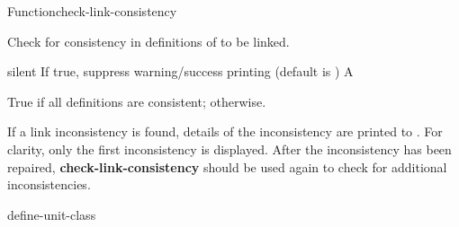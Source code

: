 \documentclass[10pt,twoside,english,pdftex]{article}
\begin{document}
\begin{functiondoc}{Function}{check-link-consistency}{
    \returns{} }
%

\fnsyntax

\fnpurpose Check for consistency in  definitions of
 to be linked.

\fnpackage {}

\fnmodule {}

\fnargs
\begin{args}{silent}
\arg[silent] If true, suppress warning/success printing (default is \nil) 
\arg[boolean] A 
\end{args}

\fnreturns True if all  definitions are consistent; \nil{}
otherwise. 

\fndescription If a link inconsistency is found, details of the
inconsistency are printed to .  For clarity,
only the first inconsistency is displayed.  After the inconsistency
has been repaired, \textbf{check-link-consistency} should be used
again to check for additional inconsistencies.

\begin{alsos}{define-unit-class}
\end{alsos}


\end{functiondoc}
\end{document}
